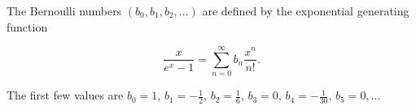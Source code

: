 The Bernoulli numbers $(b_0, b_1, b_2, \ldots)$ are defined by the exponential generating function

$$\frac{x}{e^x - 1} = \sum_{n=0}^{\infty} b_n \frac{x^n}{n!}.$$

The first few values are $b_0 = 1$, $b_1 = -\frac{1}{2}$, $b_2 = \frac{1}{6}$, $b_3 = 0$, $b_4 = -\frac{1}{30}$, $b_5 = 0, \ldots$
